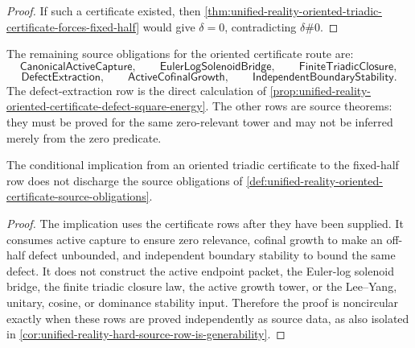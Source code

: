 \begin{proof}
If such a certificate existed, then
\autoref{thm:unified-reality-oriented-triadic-certificate-forces-fixed-half}
would give $\delta=0$, contradicting $\delta\#0$.
\end{proof}

\begin{definition}
\label{def:unified-reality-oriented-certificate-source-obligations}
The remaining source obligations for the oriented certificate route are:
$$
\mathsf{CanonicalActiveCapture},
\qquad
\mathsf{EulerLogSolenoidBridge},
\qquad
\mathsf{FiniteTriadicClosure},
$$
$$
\mathsf{DefectExtraction},
\qquad
\mathsf{ActiveCofinalGrowth},
\qquad
\mathsf{IndependentBoundaryStability}.
$$
The defect-extraction row is the direct calculation of
\autoref{prop:unified-reality-oriented-certificate-defect-square-energy}.
The other rows are source theorems: they must be proved for the same
zero-relevant tower and may not be inferred merely from the zero
predicate.
\end{definition}

\begin{theorem}
\label{thm:unified-reality-oriented-certificate-source-obligations-noncircular-content}
The conditional implication from an oriented triadic certificate to the
fixed-half row does not discharge the source obligations of
\autoref{def:unified-reality-oriented-certificate-source-obligations}.
\end{theorem}

\begin{proof}
The implication uses the certificate rows after they have been supplied.
It consumes active capture to ensure zero relevance, cofinal growth to
make an off-half defect unbounded, and independent boundary stability to
bound the same defect.  It does not construct the active endpoint packet,
the Euler-log solenoid bridge, the finite triadic closure law, the active
growth tower, or the Lee--Yang, unitary, cosine, or dominance stability
input.  Therefore the proof is noncircular exactly when these rows are
proved independently as source data, as also isolated in
\autoref{cor:unified-reality-hard-source-row-is-generability}.
\end{proof}
